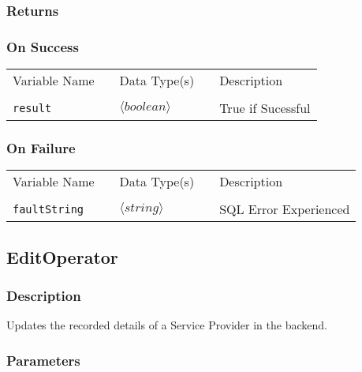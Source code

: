 \subsubsection{Returns}

\subsubsection{On Success}

\begin{tabular}{lllll}
Variable Name	&		&	Data Type(s)		&	&	Description	\\
				&	&	&	&	\\
\verb!result! & \hspace{15mm} & $\langle boolean\rangle $ & \hspace{15mm} & True if Sucessful \\
\end{tabular}

\subsubsection{On Failure}

\begin{tabular}{lllll}
Variable Name	&		&	Data Type(s)		&	&	Description	\\
				&	&	&	&	\\
\verb!faultString! & \hspace{15mm} & $\langle string\rangle $ & \hspace{15mm} & SQL Error Experienced \\
\end{tabular}


\subsection{EditOperator}

\subsubsection{Description}

Updates the recorded details of a Service Provider in the backend.

\subsubsection{Parameters}

